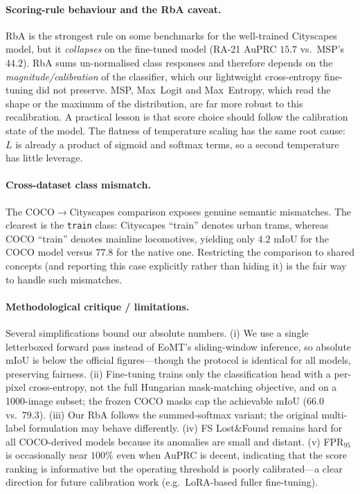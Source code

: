 \documentclass[10pt,twocolumn]{article}
\begin{document}
\paragraph{Scoring-rule behaviour and the RbA caveat.}
RbA is the strongest rule on some benchmarks for the well-trained Cityscapes
model, but it \emph{collapses} on the fine-tuned model (RA-21 AuPRC $15.7$ vs.\
MSP's $44.2$). RbA sums un-normalised class responses and therefore depends on
the \emph{magnitude/calibration} of the classifier, which our lightweight
cross-entropy fine-tuning did not preserve. MSP, Max~Logit and Max~Entropy, which
read the shape or the maximum of the distribution, are far more robust to this
recalibration. A practical lesson is that score choice should follow the
calibration state of the model. The flatness of temperature scaling has the same
root cause: $L$ is already a product of sigmoid and softmax terms, so a second
temperature has little leverage.

\paragraph{Cross-dataset class mismatch.}
The COCO$\to$Cityscapes comparison exposes genuine semantic mismatches. The
clearest is the \texttt{train} class: Cityscapes ``train'' denotes urban trams,
whereas COCO ``train'' denotes mainline locomotives, yielding only $4.2$ mIoU
for the COCO model versus $77.8$ for the native one. Restricting the comparison
to shared concepts (and reporting this case explicitly rather than hiding it) is
the fair way to handle such mismatches.

\paragraph{Methodological critique / limitations.}
Several simplifications bound our absolute numbers. (i) We use a single
letterboxed forward pass instead of EoMT's sliding-window inference, so absolute
mIoU is below the official figures---though the protocol is identical for all
models, preserving fairness. (ii) Fine-tuning trains only the classification
head with a per-pixel cross-entropy, not the full Hungarian mask-matching
objective, and on a 1000-image subset; the frozen COCO masks cap the achievable
mIoU (66.0 vs.\ 79.3). (iii) Our RbA follows the summed-softmax variant; the
original multi-label formulation may behave differently. (iv) FS Lost\&Found
remains hard for all COCO-derived models because its anomalies are small and
distant. (v) FPR$_{95}$ is occasionally near $100\%$ even when AuPRC is decent,
indicating that the score ranking is informative but the operating threshold is
poorly calibrated---a clear direction for future calibration work (e.g.\ LoRA-based
fuller fine-tuning).
\end{document}
